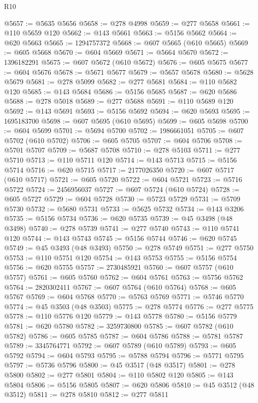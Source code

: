 \begin{lexlean}{R10}
\begin{coremodule}
@5657 := @5635 @5656
@5658 := @278 @4998
@5659 := @277 @5658
@5661 := @110 @5659 @120
@5662 := @143 @5661
@5663 := @5156 @5662
@5664 := @620 @5663
@5665 := 1294757372
@5668 := @607 @5665 (@610 @5665)
@5669 := @605 @5668
@5670 := @604 @5669
@5671 := @5664 @5670
@5672 := 1396182291
@5675 := @607 @5672 (@610 @5672)
@5676 := @605 @5675
@5677 := @604 @5676
@5678 := @5671 @5677
@5679 := @5657 @5678
@5680 := @5628 @5679
@5681 := @278 @5099
@5682 := @277 @5681
@5684 := @110 @5682 @120
@5685 := @143 @5684
@5686 := @5156 @5685
@5687 := @620 @5686
@5688 := @278 @5018
@5689 := @277 @5688
@5691 := @110 @5689 @120
@5692 := @143 @5691
@5693 := @5156 @5692
@5694 := @620 @5693
@5695 := 1695183700
@5698 := @607 @5695 (@610 @5695)
@5699 := @605 @5698
@5700 := @604 @5699
@5701 := @5694 @5700
@5702 := 1986661051
@5705 := @607 @5702 (@610 @5702)
@5706 := @605 @5705
@5707 := @604 @5706
@5708 := @5701 @5707
@5709 := @5687 @5708
@5710 := @278 @5103
@5711 := @277 @5710
@5713 := @110 @5711 @120
@5714 := @143 @5713
@5715 := @5156 @5714
@5716 := @620 @5715
@5717 := 2177026350
@5720 := @607 @5717 (@610 @5717)
@5721 := @605 @5720
@5722 := @604 @5721
@5723 := @5716 @5722
@5724 := 2456956037
@5727 := @607 @5724 (@610 @5724)
@5728 := @605 @5727
@5729 := @604 @5728
@5730 := @5723 @5729
@5731 := @5709 @5730
@5732 := @5680 @5731
@5733 := @5625 @5732
@5734 := @143 @3206
@5735 := @5156 @5734
@5736 := @620 @5735
@5739 := @45 @3498 (@48 @3498)
@5740 := @278 @5739
@5741 := @277 @5740
@5743 := @110 @5741 @120
@5744 := @143 @5743
@5745 := @5156 @5744
@5746 := @620 @5745
@5749 := @45 @3493 (@48 @3493)
@5750 := @278 @5749
@5751 := @277 @5750
@5753 := @110 @5751 @120
@5754 := @143 @5753
@5755 := @5156 @5754
@5756 := @620 @5755
@5757 := 2730485921
@5760 := @607 @5757 (@610 @5757)
@5761 := @605 @5760
@5762 := @604 @5761
@5763 := @5756 @5762
@5764 := 2820302411
@5767 := @607 @5764 (@610 @5764)
@5768 := @605 @5767
@5769 := @604 @5768
@5770 := @5763 @5769
@5771 := @5746 @5770
@5774 := @45 @3503 (@48 @3503)
@5775 := @278 @5774
@5776 := @277 @5775
@5778 := @110 @5776 @120
@5779 := @143 @5778
@5780 := @5156 @5779
@5781 := @620 @5780
@5782 := 3259730800
@5785 := @607 @5782 (@610 @5782)
@5786 := @605 @5785
@5787 := @604 @5786
@5788 := @5781 @5787
@5789 := 3345764771
@5792 := @607 @5789 (@610 @5789)
@5793 := @605 @5792
@5794 := @604 @5793
@5795 := @5788 @5794
@5796 := @5771 @5795
@5797 := @5736 @5796
@5800 := @45 @3517 (@48 @3517)
@5801 := @278 @5800
@5802 := @277 @5801
@5804 := @110 @5802 @120
@5805 := @143 @5804
@5806 := @5156 @5805
@5807 := @620 @5806
@5810 := @45 @3512 (@48 @3512)
@5811 := @278 @5810
@5812 := @277 @5811

\end{coremodule}
\end{lexlean}
